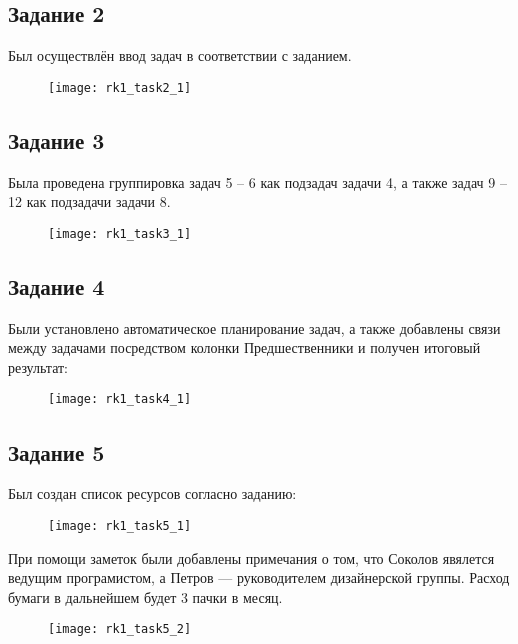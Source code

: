 \subsection*{Задание 2}

Был осуществлён ввод задач в соответствии с заданием.

\begin{figure}[h!]
	\texttt{[image: rk1\_task2\_1]}
\end{figure}

\subsection*{Задание 3}

Была проведена группировка задач 5 -- 6 как подзадач задачи 4, а также задач 9 -- 12 как подзадачи задачи 8.

\begin{figure}[h!]
	\texttt{[image: rk1\_task3\_1]}
\end{figure}
\clearpage

\subsection*{Задание 4}

Были установлено автоматическое планирование задач, а также добавлены связи между задачами посредством колонки Предшественники и получен итоговый результат:

\begin{figure}[h!]
	\texttt{[image: rk1\_task4\_1]}
\end{figure}

\subsection*{Задание 5}

Был создан список ресурсов согласно заданию:

\begin{figure}[h!]
	\texttt{[image: rk1\_task5\_1]}
\end{figure}

При помощи заметок были добавлены примечания о том, что Соколов явялется ведущим програмистом, а Петров --- руководителем дизайнерской группы. Расход бумаги в дальнейшем будет 3 пачки в месяц.

\begin{figure}[h!]
	\texttt{[image: rk1\_task5\_2]}
\end{figure}

